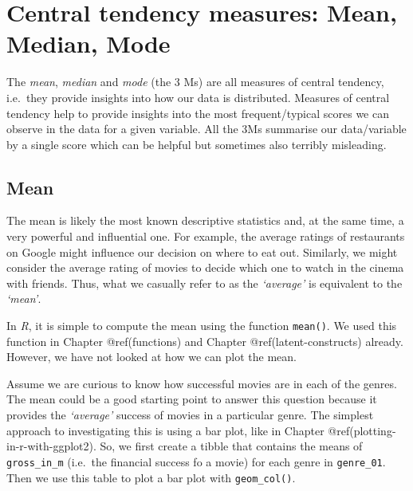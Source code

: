 \documentclass[
  letterpaper,
]{krantz}
\begin{document}
\section{Central tendency measures: Mean, Median,
Mode}\label{central-tendency}

The \emph{mean}, \emph{median} and \emph{mode} (the 3 Ms) are all
measures of central tendency, i.e.~they provide insights into how our
data is distributed. Measures of central tendency help to provide
insights into the most frequent/typical scores we can observe in the
data for a given variable. All the 3Ms summarise our data/variable by a
single score which can be helpful but sometimes also terribly
misleading.

\subsection{Mean}\label{mean}

The mean is likely the most known descriptive statistics and, at the
same time, a very powerful and influential one. For example, the average
ratings of restaurants on Google might influence our decision on where
to eat out. Similarly, we might consider the average rating of movies to
decide which one to watch in the cinema with friends. Thus, what we
casually refer to as the \emph{`average'} is equivalent to the
\emph{`mean'}.

In \emph{R}, it is simple to compute the mean using the function
\texttt{mean()}. We used this function in Chapter @ref(functions) and
Chapter @ref(latent-constructs) already. However, we have not looked at
how we can plot the mean.

Assume we are curious to know how successful movies are in each of the
genres. The mean could be a good starting point to answer this question
because it provides the \emph{`average'} success of movies in a
particular genre. The simplest approach to investigating this is using a
bar plot, like in Chapter @ref(plotting-in-r-with-ggplot2). So, we first
create a tibble that contains the means of \texttt{gross\_in\_m}
(i.e.~the financial success fo a movie) for each genre in
\texttt{genre\_01}. Then we use this table to plot a bar plot with
\texttt{geom\_col()}.
\end{document}
